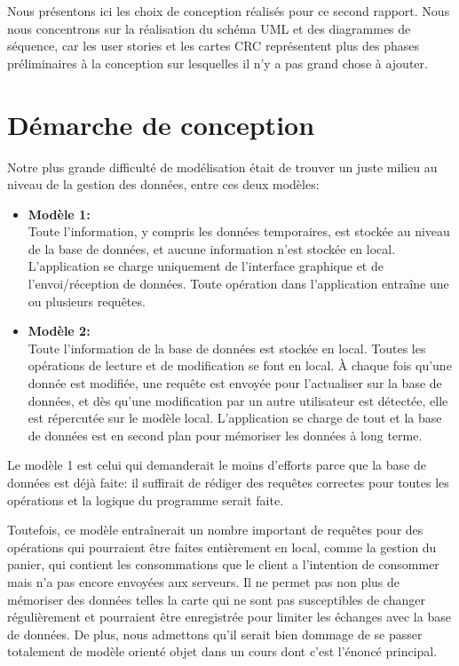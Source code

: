 \documentclass[a4paper,10pt]{article}
\begin{document}

Nous présentons ici les choix de conception réalisés pour ce second rapport.
Nous nous concentrons sur la réalisation du schéma UML et des diagrammes de séquence, car les user stories et les cartes CRC représentent plus des phases préliminaires à la conception sur lesquelles il n'y a pas grand chose à ajouter.

\section{Démarche de conception}

Notre plus grande difficulté de modélisation était de trouver un juste milieu au niveau de la gestion des données, entre ces deux modèles:
\begin{itemize}
    \item \textbf{Modèle 1:}\\ Toute l'information, y compris les données temporaires, est stockée au niveau de la base de données, et aucune information n'est stockée en local. L'application se charge uniquement de l'interface graphique et de l'envoi/réception de données. Toute opération dans l'application entraîne une ou plusieurs requêtes.
    \item \textbf{Modèle 2:}\\ Toute l'information de la base de données est stockée en local. Toutes les opérations de lecture et de modification se font en local. À chaque fois qu'une donnée est modifiée, une requête est envoyée pour l'actualiser sur la base de données, et dès qu'une modification par un autre utilisateur est détectée, elle est répercutée sur le modèle local. L'application se charge de tout et la base de données est en second plan pour mémoriser les données à long terme.
\end{itemize}

Le modèle 1 est celui qui demanderait le moins d'efforts parce que la base de données est déjà faite: il suffirait de rédiger des requêtes correctes pour toutes les opérations et la logique du programme serait faite.

Toutefois, ce modèle entraînerait un nombre important de requêtes pour des opérations qui pourraient être faites entièrement en local, comme la gestion du panier, qui contient les consommations que le client a l'intention de consommer mais n'a pas encore envoyées aux serveurs. Il ne permet pas non plus de mémoriser des données telles la carte qui ne sont pas susceptibles de changer régulièrement et pourraient être enregistrée pour limiter les échanges avec la base de données. De plus, nous admettons qu'il serait bien dommage de se passer totalement de modèle orienté objet dans un cours dont c'est l'énoncé principal.
\end{document}
